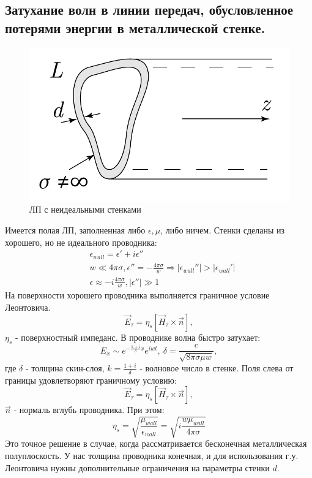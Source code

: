 \subsection{Затухание волн в линии передач, обусловленное потерями энергии в металлической стенке.}
\begin{figure}[h!]
	\centering
	\includegraphics[width = 0.4\linewidth]{img/9-1-1.pdf}
	\caption{ЛП с неидеальными стенками}
\end{figure}
Имеется полая ЛП, заполненная либо $\epsilon,\mu$, либо ничем. Стенки сделаны из хорошего, но не идеального проводника:
\begin{align*}
	&\epsilon_{wall} = \epsilon' +i\epsilon''\\
	&w\ll 4\pi \sigma, \epsilon'' = -\frac{4\pi\sigma}{w} \Rightarrow |\epsilon_{wall}''|>|\epsilon_{wall}'|\\
	&\epsilon \approx -i \frac{4\pi \sigma}{w}, |\epsilon''|\gg 1
\end{align*}
На поверхности хорошего проводника выполняется граничное условие Леонтовича.
\begin{equation}
	\vec{E}_{\tau} = \eta_s\left[\vec{H}_{\tau} \times \vec{n}\right]	,
\end{equation}
$\eta_s$ - поверхностный импеданс.
В проводнике волна быстро затухает:
\begin{equation}
	E_x \sim e^{-\frac{1+i}{\delta}x}e^{iwt},~ \delta = \frac{c}{\sqrt{8\pi\sigma\mu w}},
\end{equation}
где $\delta$ - толщина скин-слоя, $k = \frac{1+i}{\delta}$ - волновое число в стенке. 
Поля слева от границы удовлетворяют граничному условию:
\begin{equation}
	\vec{E}_{\tau} = \eta_s\left[\vec{H}_{\tau} \times \vec{n}\right]	,
\end{equation}
$\vec{n}$ - нормаль вглубь проводника. При этом:
\begin{equation}
	\eta_s = \sqrt{\frac{\mu_{wall}}{\epsilon_{wall}}} = \sqrt{i\frac{w\mu_{wall}}{4\pi\sigma}}
\end{equation}
Это точное решение в случае, когда рассматривается бесконечная металлическая полуплоскость. У нас толщина проводника
конечная, и для использования г.у. Леонтовича нужны дополнительные ограничения на параметры стенки $d$.


